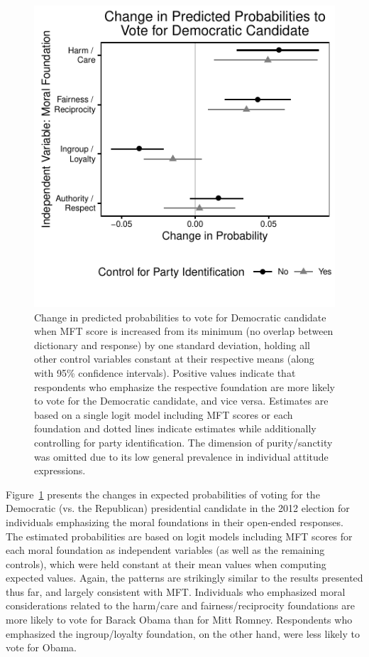 \documentclass[12pt]{article}
\begin{document}
\begin{figure}[ht]\centering
\includegraphics[scale=.9]{../calc/fig/logit_vote.pdf}
\caption{Change in predicted probabilities to vote for Democratic candidate when MFT score is increased from its minimum (no overlap between dictionary and response) by one standard deviation, holding all other control variables constant at their respective means (along with 95\% confidence intervals). Positive values indicate that respondents who emphasize the respective foundation are more likely to vote for the Democratic candidate, and vice versa. Estimates are based on a single logit model including MFT scores or each foundation and dotted lines indicate estimates while additionally controlling for party identification. The dimension of purity/sanctity was omitted due to its low general prevalence in individual attitude expressions. %
}\label{fig:logit_vote}
\end{figure}

Figure~\ref{fig:logit_vote} presents the changes in expected probabilities of voting for the Democratic (vs. the Republican) presidential candidate in the 2012 election for individuals emphasizing the moral foundations in their open-ended responses. The estimated probabilities are based on logit models including MFT scores for each moral foundation as independent variables (as well as  the remaining controls), which were held constant at their mean values when computing expected values. Again, the patterns are strikingly similar to the results presented thus far, and largely consistent with MFT. Individuals who emphasized moral considerations related to the harm/care and fairness/reciprocity foundations are more likely to vote for Barack Obama than for Mitt Romney. Respondents who emphasized the ingroup/loyalty foundation, on the other hand, were less likely to vote for Obama. 
\end{document}

